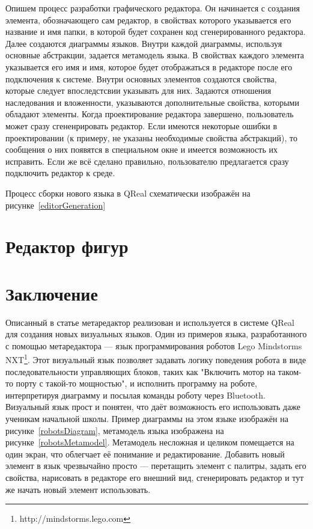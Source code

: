 \documentclass[a4paper]{article}
\begin{document}
Опишем процесс разработки графического редактора. Он начинается с создания элемента, обозначающего сам редактор, в свойствах которого указывается его название и имя папки, в которой будет сохранен код сгенерированного редактора. Далее создаются диаграммы языков. Внутри каждой диаграммы, используя основные абстракции, задается метамодель языка. В свойствах каждого элемента указывается его имя и имя, которое будет отображаться в редакторе после его подключения к системе. Внутри основных элементов создаются свойства, которые следует впоследстсвии указывать для них. Задаются отношения наследования и вложенности, указываются дополнительные свойства, которыми обладают элементы. Когда проектирование редактора завершено, пользователь может сразу сгененрировать редактор. Если имеются некоторые ошибки в проектировании (к примеру, не указаны необходимые свойства абстракций), то сообщения о них появятся в специальном окне и имеется возможность их исправить. Если же всё сделано правильно, пользователю предлагается сразу подключить редактор к среде.  

Процесс сборки нового языка в QReal схематически изображён на рисунке~\ref{editorGeneration}

\section{Редактор фигур}

\section{Заключение}
Описанный в статье метаредактор реализован и используется в системе QReal для создания новых визуальных языков. Один из примеров языка, разработанного с помощью метаредактора --- язык программирования роботов Lego Mindstorms NXT\footnote{http://mindstorms.lego.com}. Этот визуальный язык позволяет задавать логику поведения робота в виде последовательности управляющих блоков, таких как "Включить мотор на таком-то порту с такой-то мощностью", и исполнить программу на роботе, интерпретируя диаграмму и посылая команды роботу через Bluetooth. Визуальный язык прост и понятен, что даёт возможность его использовать даже ученикам начальной школы. Пример диаграммы на этом языке изображён на рисунке~\ref{robotsDiagram}, метамодель языка изображена на рисунке~\ref{robotsMetamodel}. Метамодель несложная и целиком помещается на один экран, что облегчает её понимание и редактирование. Добавить новый элемент в язык чрезвычайно просто --- перетащить элемент с палитры, задать его свойства, нарисовать в редакторе его внешний вид, сгенерировать редактор и тут же начать новый элемент использовать.
\end{document}
